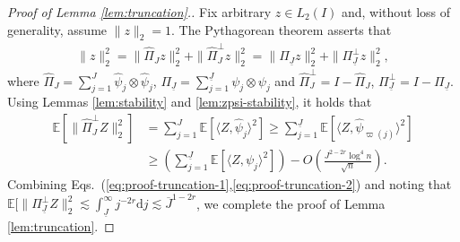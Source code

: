 \documentclass[11pt,a4paper]{article}
\renewcommand{\hat}{\widehat}
\renewcommand{\bar}{\overline}
\theoremstyle{definition}
\theoremstyle{plain}
\theoremstyle{remark}
\newcommand{\ud}{\mathrm d}
\newcommand{\und}{\underline}
\begin{document}
\begin{proof}[Proof of Lemma \ref{lem:truncation}.]
Fix arbitrary $z\in L_2(I)$ and, without loss of generality, assume $\|z\|_2=1$.
The Pythagorean theorem asserts that
\begin{align}
\|z\|_2^2 = \|\hat\Pi_{J}z\|_2^2+\|\hat\Pi_{J}^\perp z\|_2^2 = \|\Pi_{\und J}z\|_2^2+\|\Pi_{\und J}^\perp z\|_2^2,
\label{eq:proof-truncation-1}
\end{align}
where $\hat\Pi_J=\sum_{j=1}^J\hat\psi_j\otimes\hat\psi_j$, $\Pi_{\und J}=\sum_{j=1}^{\und J}\psi_j\otimes\psi_j$ and $\hat\Pi_J^\perp=I-\hat\Pi_J$, $\Pi_{\und J}^\perp = I-\Pi_{\und J}$.
Using Lemmas \ref{lem:stability} and \ref{lem:zpsi-stability}, it holds that
\begin{align}
\mathbb E[\|\hat\Pi_J^\perp Z\|_2^2] &= \sum_{j=1}^J \mathbb E[\langle Z,\hat\psi_j\rangle^2] \geq \sum_{j=1}^{\und J}\mathbb E[\langle Z,\hat\psi_{\varpi(j)}\rangle^2]\nonumber\\
&\geq \left(\sum_{j=1}^{\und J}\mathbb E[\langle Z,\psi_j\rangle^2]\right) - O\left(\frac{J^{2-2r}\log^4 n}{\sqrt{n}}\right).\label{eq:proof-truncation-2}
\end{align}
Combining Eqs.~(\ref{eq:proof-truncation-1},\ref{eq:proof-truncation-2}) and noting that $\mathbb E[\|\Pi_{\und J}^\perp Z\|_2^2 \lesssim \int_{\und J}^{\infty} j^{-2r}\ud j \lesssim \bar J^{1-2r}$, 
we complete the proof of Lemma \ref{lem:truncation}.

\end{proof}
\end{document}
